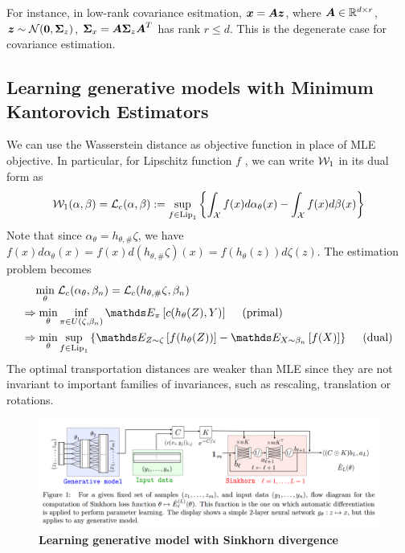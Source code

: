 \documentclass[11pt]{article}
\begin{document}
For instance, in low-rank covariance esitmation, $\boldsymbol{x} = \boldsymbol{A}\boldsymbol{z}$, where $\boldsymbol{A} \in {\mathbb R}^{d \times r}$, $\boldsymbol{z} \sim {\mathcal N}(\boldsymbol{0}, \boldsymbol{\Sigma}_{z})$,  $\boldsymbol{\Sigma}_{x} = \boldsymbol{A}\boldsymbol{\Sigma}_{z}\boldsymbol{A}^{T}$ has rank $r \le d$. This is the degenerate case for covariance estimation.

\subsection{Learning generative models with Minimum Kantorovich Estimators}
We can use the Wasserstein distance as objective function in place of MLE objective. In particular, for Lipschitz function $f$ , we can write ${\mathcal W}_1$ in its dual form as 
\begin{align}
{\mathcal W}_1(\alpha, \beta) = {\mathcal L}_{c}(\alpha, \beta) := \sup_{f \in \text{Lip}_1} \left\{\int_{{\mathcal X}} f(x) d\alpha_{\theta}(x)  - \int_{{\mathcal X}} f(x) d\beta(x)\right\} \label{eqn: wasserstein_1_dual}
\end{align} Note that since $\alpha_{\theta} = h_{\theta, \#}\zeta$, we have $f(x)d\alpha_{\theta}(x)  = f(x)d (h_{\theta, \#}\zeta)(x) = f(h_{\theta}(z)) d\zeta(z)$. The estimation problem becomes 
\begin{align}
\min_{\theta}\;&\cL_{c}(\alpha_{\theta}, \beta_{n}) = \cL_{c}(h_{\theta, \#}\zeta, \beta_{n})  \label{eqn: min_kantorovich_est}\\
\Rightarrow \min_{\theta}&\inf_{\pi \in U(\zeta, \beta_{n})}\E{\pi}{c(h_{\theta}(Z), Y )}     \quad\text{ (primal)} \label{eqn: min_kantorovich_est_primal}\\
\Rightarrow \min_{\theta}&\sup_{f \in  \text{Lip}_1}\set{\E{Z \sim \zeta}{f(h_{\theta}(Z))}  -  \E{X \sim \beta_{n}}{f(X)}}      \quad\text{ (dual)}\label{eqn: min_kantorovich_est_dual}
\end{align} The optimal transportation distances are weaker than MLE since  they are not invariant to important families of invariances, such as rescaling, translation or rotations. 

\begin{figure}
\begin{minipage}[t]{1\linewidth}
  \centering
  \centerline{\includegraphics[scale = 0.3]{model_learning_sinkhorn_divergence.png}}
\end{minipage}
\caption{\footnotesize{\textbf{Learning generative model with Sinkhorn divergence \citep{genevay2018learning} }}}
\label{fig: barycenter_ent_reg}
\end{figure}
\end{document}
